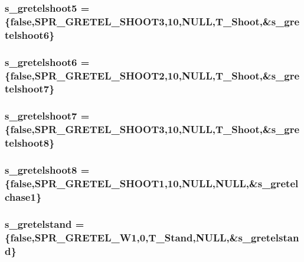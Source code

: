 \label{WL__ACT2_8C_aee62a066bdc868cc8dd092d4478aa228}
\hypertarget{WL__ACT2_8C_afe10dbc0c6c8888c5787db8bf9132b05}{
\subsubsection[{s\_\-gretelshoot5}]{ {\bf s\_\-gretelshoot5} = \{false,SPR\_\-GRETEL\_\-SHOOT3,10,NULL,T\_\-Shoot,\&{\bf s\_\-gretelshoot6}\}}}
\label{WL__ACT2_8C_afe10dbc0c6c8888c5787db8bf9132b05}
\hypertarget{WL__ACT2_8C_a26398808f97d76d25a767d813890f24f}{
\subsubsection[{s\_\-gretelshoot6}]{ {\bf s\_\-gretelshoot6} = \{false,SPR\_\-GRETEL\_\-SHOOT2,10,NULL,T\_\-Shoot,\&{\bf s\_\-gretelshoot7}\}}}
\label{WL__ACT2_8C_a26398808f97d76d25a767d813890f24f}
\hypertarget{WL__ACT2_8C_a547bc0128e37954cbaea07a769569f36}{
\subsubsection[{s\_\-gretelshoot7}]{ {\bf s\_\-gretelshoot7} = \{false,SPR\_\-GRETEL\_\-SHOOT3,10,NULL,T\_\-Shoot,\&{\bf s\_\-gretelshoot8}\}}}
\label{WL__ACT2_8C_a547bc0128e37954cbaea07a769569f36}
\hypertarget{WL__ACT2_8C_ab1b33086e3cb6493142d222a87a8385e}{
\subsubsection[{s\_\-gretelshoot8}]{ {\bf s\_\-gretelshoot8} = \{false,SPR\_\-GRETEL\_\-SHOOT1,10,NULL,NULL,\&{\bf s\_\-gretelchase1}\}}}
\label{WL__ACT2_8C_ab1b33086e3cb6493142d222a87a8385e}
\hypertarget{WL__ACT2_8C_a6982d149c8cf782eb51cdbd3885455cc}{
\subsubsection[{s\_\-gretelstand}]{ {\bf s\_\-gretelstand} = \{false,SPR\_\-GRETEL\_\-W1,0,T\_\-Stand,NULL,\&{\bf s\_\-gretelstand}\}}}
